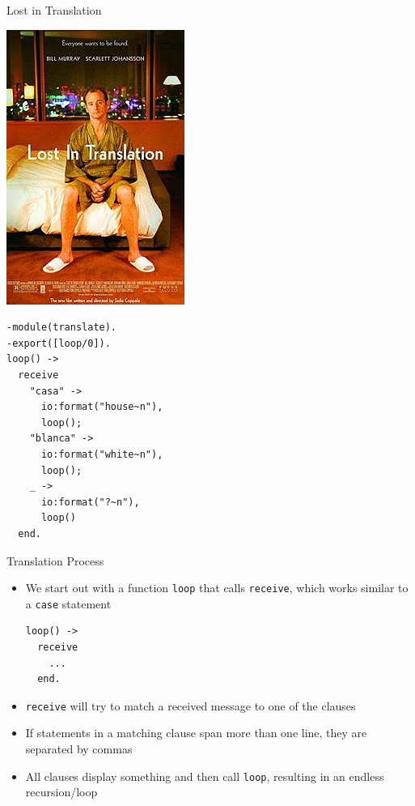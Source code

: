\documentclass[12pt,xcolor=svgnames]{beamer}
\begin{document}
\begin{frame}{Lost in Translation}

\centerline{\includegraphics[scale=0.6]{images/Lost_in_Translation_poster.png}}

\framebreak

\begin{Verbatim}
-module(translate).
-export([loop/0]).
loop() ->
  receive
    "casa" -> 
      io:format("house~n"),
      loop();
    "blanca" -> 
      io:format("white~n"),
      loop();
    _ ->
      io:format("?~n"),
      loop()
  end.
\end{Verbatim}
\end{frame}

\begin{frame}[fragile]{Translation Process}
\begin{itemize}
\item We start out with a function \texttt{loop} that calls \texttt{receive}, which works similar to 
a \texttt{case} statement
\begin{Verbatim}
loop() ->
  receive
    ...
  end.
\end{Verbatim}
\item \texttt{receive} will try to match a received message to one of the clauses
\item If statements in a matching clause span more than one line, they are separated by commas
\item All clauses display something and then call \texttt{loop}, resulting in an endless recursion/loop
\end{itemize}
\end{frame}
\end{document}
